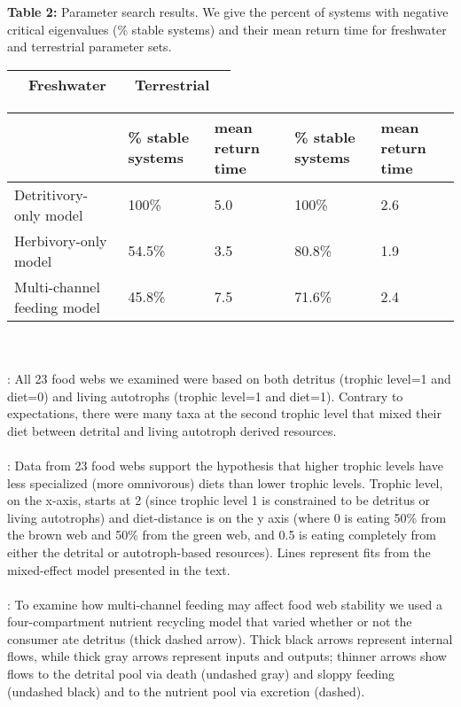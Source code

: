 \documentclass[12pt,a4paper,oneside]{article}
\begin{document}
\newpage
\noindent \textbf{Table 2:} Parameter search results. We give the percent of systems with negative critical eigenvalues (\% stable systems) and their mean return time for freshwater and terrestrial parameter sets.
\begin{center}
{\footnotesize 
  \begin{tabular}{| p{4.5cm} | p{2cm}  p{2cm} || p{2cm} p{2cm} |  }   
\hline \hline
 & Freshwater & & Terrestrial  &\\ \hline
\end{tabular}
  \begin{tabular}{ | p{4.5cm} |  p{2cm} | p{2cm} || p{2cm} | p{2cm} | }   
\hline \hline
 & \% stable systems & mean return time & \% stable systems & mean return time \\ \hline
Detritivory-only model & 100\% & 5.0 & 100\% & 2.6 \\ \hline
Herbivory-only model & 54.5\% & 3.5 & 80.8\% & 1.9\\ \hline
Multi-channel feeding model & 45.8\% & 7.5 & 71.6\% & 2.4 \\ \hline
\end{tabular}}
\end{center}


\newpage
{}\\

\\
: All 23 food webs we examined were based on
both detritus (trophic level=1 and diet=0) and living autotrophs
(trophic level=1 and diet=1). Contrary to expectations, there were
many taxa at the second trophic level that mixed their diet between
detrital and living autotroph derived resources. \\
\\
: Data from 23 food webs support the
hypothesis that higher trophic levels have less specialized
(more omnivorous) diets than lower trophic levels. Trophic level, on
the x-axis, starts at 2 (since trophic level 1 is constrained to be
detritus or living autotrophs) and diet-distance is on the y axis
(where 0 is eating 50\% from the brown web and 50\% from the green web, and 0.5 is
eating completely from either the detrital or autotroph-based
resources). Lines represent fits from the mixed-effect model presented
in the text.\\
\\
: To examine how multi-channel feeding may
affect food web stability we used a four-compartment nutrient recycling
model that varied whether or not the consumer ate detritus (thick dashed
arrow). Thick black arrows represent internal flows, while thick gray arrows
represent inputs and outputs; thinner arrows show flows
to the detrital pool via death (undashed gray) and sloppy feeding (undashed black) and to the nutrient
pool via excretion (dashed). \\
\end{document}
